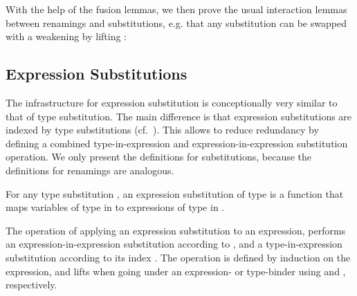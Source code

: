 \documentclass[acmsmall,anonymous,review,screen]{acmart}
\begin{document}
With the help of the fusion lemmas, we then prove the usual interaction lemmas
between renamings and substitutions, e.g. that any substitution
 can be swapped with a weakening  by lifting :
\TFSwapTsubTwk



\subsection{Expression Substitutions}
\label{sec:substitutions:expr}

The infrastructure for expression substitution is conceptionally very similar to
that of type substitution.
The main difference is that expression substitutions are indexed by
type substitutions (cf.~\cite{DBLP:conf/mpc/ChapmanKNW19}).
This allows to reduce redundancy by defining a combined type-in-expression and
expression-in-expression substitution operation.
We only present the definitions for substitutions, because
the definitions for renamings are analogous.

For any type substitution , an expression substitution of
type  is a function that maps variables of type  in
 to expressions of type  in .
\SubDefESub

The operation {\AEsub} of applying an expression substitution  to an expression,
performs an expression-in-expression substitution according to ,
and a type-in-expression substitution according to its index .
The operation is defined by induction on the expression, and lifts  when
going under an expression- or type-binder using {\AEliftS} and
{\AEliftSL}, respectively.
\SubDefEsub


\end{document}
